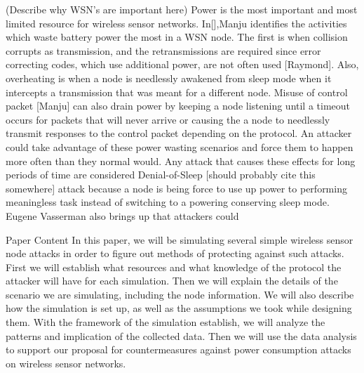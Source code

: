 (Describe why WSN’s are important here)
Power is the most important and most limited resource for wireless sensor networks. In[],Manju identifies the activities which waste battery power the most in a WSN node.  The first is when collision corrupts as transmission, and the retransmissions are required since error correcting codes, which use additional power, are not often used [Raymond]. Also, overheating is when a node is needlessly awakened from sleep mode when it intercepts a transmission that was meant for a different node.  Misuse of control packet [Manju] can also drain power by keeping a node listening until a timeout occurs for packets that will never arrive or causing the a node to needlessly transmit responses to the control packet depending on the protocol. 
	An attacker could take advantage of these power wasting scenarios and force them to happen more often than they normal would.  Any attack that causes these effects for long periods of time are considered Denial-of-Sleep [should probably cite this somewhere] attack because a node is being force to use up power to performing meaningless task instead of switching to a powering conserving sleep mode. Eugene Vasserman also brings up that attackers could 

Paper Content
In this paper, we will be simulating several simple wireless sensor node attacks in order to figure out methods of protecting against such attacks. First we will establish what resources and what knowledge of the protocol the attacker will have for each simulation. Then we will explain the details of the scenario we are simulating, including the node information. We will also describe how the simulation is set up, as well as the assumptions we took while designing them. With the framework of the simulation establish, we will analyze the patterns and implication of the collected data. Then we will use the data analysis to support our proposal for countermeasures against power consumption attacks on wireless sensor networks.


